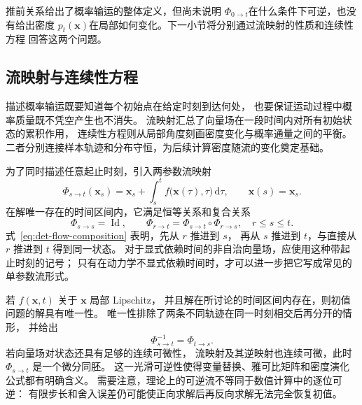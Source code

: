 推前关系给出了概率输运的整体定义，但尚未说明
$\Phi_{0\to t}$在什么条件下可逆，也没有给出密度
$p_t(\mathbf{x})$在局部如何变化。下一小节将分别通过流映射的性质和连续性方程
回答这两个问题。

\subsection{流映射与连续性方程}

描述概率输运既要知道每个初始点在给定时刻到达何处，
也要保证运动过程中概率质量既不凭空产生也不消失。
流映射汇总了向量场在一段时间内对所有初始状态的累积作用，
连续性方程则从局部角度刻画密度变化与概率通量之间的平衡。
二者分别连接样本轨迹和分布守恒，为后续计算密度随流的变化奠定基础。

为了同时描述任意起止时刻，引入两参数流映射
\begin{equation}
    \Phi_{s\to t}(\mathbf{x}_s)
    =
    \mathbf{x}_s
    +
    \int_s^t
    f\bigl(\mathbf{x}(\tau),\tau\bigr)\,\mathrm{d}\tau,
    \qquad
    \mathbf{x}(s)=\mathbf{x}_s.
    \label{eq:det-two-time-flow}
\end{equation}
在解唯一存在的时间区间内，它满足恒等关系和复合关系
\begin{equation}
    \Phi_{s\to s}=\operatorname{Id},
    \qquad
    \Phi_{r\to t}
    =
    \Phi_{s\to t}\circ\Phi_{r\to s},
    \quad r\leq s\leq t.
    \label{eq:det-flow-composition}
\end{equation}
式~\eqref{eq:det-flow-composition} 表明，先从 \(r\) 推进到 \(s\)，
再从 \(s\) 推进到 \(t\)，与直接从 \(r\) 推进到 \(t\) 得到同一状态。
对于显式依赖时间的非自治向量场，应使用这种带起止时刻的记号；
只有在动力学不显式依赖时间时，才可以进一步把它写成常见的单参数流形式。

若 \(f(\mathbf{x},t)\) 关于 \(\mathbf{x}\) 局部 Lipschitz，
并且解在所讨论的时间区间内存在，则初值问题的解具有唯一性。
唯一性排除了两条不同轨迹在同一时刻相交后再分开的情形，
并给出
\begin{equation}
    \Phi_{s\to t}^{-1}
    =
    \Phi_{t\to s}.
    \label{eq:det-flow-inverse}
\end{equation}
若向量场对状态还具有足够的连续可微性，
流映射及其逆映射也连续可微，此时
\(\Phi_{s\to t}\) 是一个微分同胚。
这一光滑可逆性使得变量替换、雅可比矩阵和密度演化公式都有明确含义。
需要注意，理论上的可逆流不等同于数值计算中的逐位可逆：
有限步长和舍入误差仍可能使正向求解后再反向求解无法完全恢复初值。

